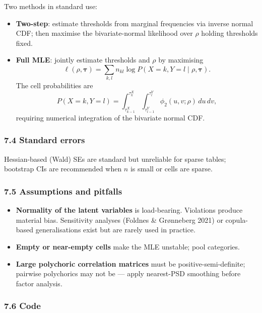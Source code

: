 \documentclass{article}
\providecommand{\tightlist}{\setlength{\itemsep}{0pt}\setlength{\parskip}{0pt}}
\begin{document}
Two methods in standard use:

\begin{itemize}
\tightlist
\item
  \textbf{Two-step}: estimate thresholds from marginal frequencies via
  inverse normal CDF; then maximise the bivariate-normal likelihood over
  \(\rho\) holding thresholds fixed.
\item
  \textbf{Full MLE}: jointly estimate thresholds and \(\rho\) by
  maximising \[
  \ell(\rho, \boldsymbol{\tau}) = \sum_{k, l} n_{kl} \log P(X = k, Y = l \mid \rho, \boldsymbol{\tau}).
  \] The cell probabilities are \[
  P(X = k, Y = l) = \int_{\tau_{k-1}^X}^{\tau_k^X} \int_{\tau_{l-1}^Y}^{\tau_l^Y} \phi_2(u, v; \rho) \, du \, dv,
  \] requiring numerical integration of the bivariate normal CDF.
\end{itemize}

\subsubsection{7.4 Standard errors}\label{74-standard-errors}

Hessian-based (Wald) SEs are standard but unreliable for sparse tables;
bootstrap CIs are recommended when \(n\) is small or cells are sparse.

\subsubsection{7.5 Assumptions and
pitfalls}\label{75-assumptions-and-pitfalls}

\begin{itemize}
\tightlist
\item
  \textbf{Normality of the latent variables} is load-bearing. Violations
  produce material bias. Sensitivity analyses (Foldnes \& Grønneberg
  2021) or copula-based generalisations exist but are rarely used in
  practice.
\item
  \textbf{Empty or near-empty cells} make the MLE unstable; pool
  categories.
\item
  \textbf{Large polychoric correlation matrices} must be
  positive-semi-definite; pairwise polychorics may not be --- apply
  nearest-PSD smoothing before factor analysis.
\end{itemize}

\subsubsection{7.6 Code}\label{76-code}
\end{document}
